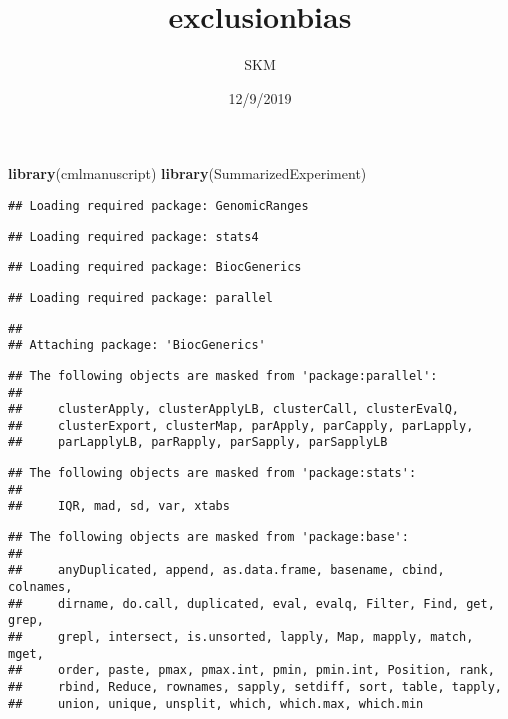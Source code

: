 \documentclass[]{article}
\title{exclusionbias}
\author{SKM}
\date{12/9/2019}
\newenvironment{Shaded}{\begin{snugshade}}{\end{snugshade}}
\newcommand{\KeywordTok}[1]{\textcolor[rgb]{0.13,0.29,0.53}{\textbf{#1}}}
\newcommand{\NormalTok}[1]{#1}
\begin{document}
\maketitle

\begin{Shaded}
\begin{Highlighting}[]
\KeywordTok{library}\NormalTok{(cmlmanuscript)}
\KeywordTok{library}\NormalTok{(SummarizedExperiment)}
\end{Highlighting}
\end{Shaded}

\begin{verbatim}
## Loading required package: GenomicRanges
\end{verbatim}

\begin{verbatim}
## Loading required package: stats4
\end{verbatim}

\begin{verbatim}
## Loading required package: BiocGenerics
\end{verbatim}

\begin{verbatim}
## Loading required package: parallel
\end{verbatim}

\begin{verbatim}
## 
## Attaching package: 'BiocGenerics'
\end{verbatim}

\begin{verbatim}
## The following objects are masked from 'package:parallel':
## 
##     clusterApply, clusterApplyLB, clusterCall, clusterEvalQ,
##     clusterExport, clusterMap, parApply, parCapply, parLapply,
##     parLapplyLB, parRapply, parSapply, parSapplyLB
\end{verbatim}

\begin{verbatim}
## The following objects are masked from 'package:stats':
## 
##     IQR, mad, sd, var, xtabs
\end{verbatim}

\begin{verbatim}
## The following objects are masked from 'package:base':
## 
##     anyDuplicated, append, as.data.frame, basename, cbind, colnames,
##     dirname, do.call, duplicated, eval, evalq, Filter, Find, get, grep,
##     grepl, intersect, is.unsorted, lapply, Map, mapply, match, mget,
##     order, paste, pmax, pmax.int, pmin, pmin.int, Position, rank,
##     rbind, Reduce, rownames, sapply, setdiff, sort, table, tapply,
##     union, unique, unsplit, which, which.max, which.min
\end{verbatim}
\end{document}
